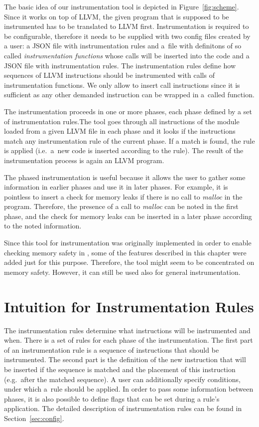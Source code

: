 The basic idea of our instrumentation tool is depicted in
Figure~\ref{fig:scheme}. Since it works on top of LLVM, the given program that
is supposed to be instrumented has to be translated to LLVM first.
Instrumentation is required to be configurable, therefore it needs to be
supplied with two config files created by a user: a JSON file with
instrumentation rules and a~file with definitons of so called
\emph{instrumentation functions} whose calls will be inserted into the code and
a JSON file with instrumentation rules. The instrumentation rules define how
sequences of LLVM instructions should be instrumented with calls of
instrumentation functions.  We only allow to insert call instructions since it
is sufficient as any other demanded instruction can be wrapped in a~called
function.

The instrumentation proceeds in one or more phases, each phase defined by a set
of instrumentation rules.The tool goes through all instructions of the module
loaded from a given LLVM file in each phase and it looks if the instructions
match any instrumentation rule of the current phase. If a match is found, the
rule is applied (i.e.~a~new code is inserted according to the rule). The result
of the instrumentation process is again an LLVM program.

The phased instrumentation is useful because it allows the user to gather some
information in earlier phases and use it in later phases. For example, it is
pointless to insert a check for memory leaks if there is no call to
\emph{malloc} in the program. Therefore, the presence of a call to
\emph{malloc} can be noted in the first phase, and the check for memory leaks
can be inserted in a later phase according to the noted information.

Since this tool for instrumentation was originally implemented in order to
enable checking memory safety in \symbiotic, some of the features described in
this chapter were added just for this purpose. Therefore, the tool might seem
to be concentrated on memory safety. However, it can still be used also for
general instrumentation.

\section{Intuition for Instrumentation Rules}
The instrumentation rules determine what instructions will be instrumented and
when. There is a set of rules for each phase of the instrumentation. The first
part of an instrumentation rule is a sequence of instructions that should be
instrumented. The second part is the definition of the new instruction that
will be inserted if the sequence is matched and the placement of this
instruction (e.g.~after the matched sequence). A user can additionally specify
conditions, under which a~rule should be applied. In order to pass some
information between phases, it is also possible to define flags that can be set
during a rule's application. The detailed description of instrumentation rules
can be found in Section~\ref{sec:config}.

